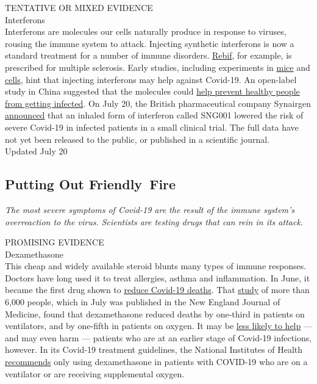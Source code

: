 TENTATIVE OR MIXED EVIDENCE\\
Interferons\\
Interferons are molecules our cells naturally produce in response to
viruses, rousing the immune system to attack. Injecting synthetic
interferons is now a standard treatment for a number of immune
disorders.
\href{https://www.nationalmssociety.org/Treating-MS/Medications/Rebif}{Rebif},
for example, is prescribed for multiple sclerosis. Early studies,
including experiments in
\href{https://pubmed.ncbi.nlm.nih.gov/32511406/}{mice} and
\href{https://academic.oup.com/jid/article/doi/10.1093/infdis/jiaa350/5860074}{cells},
hint that injecting interferons may help against Covid-19. An open-label
study in China suggested that the molecules could
\href{https://www.medrxiv.org/content/10.1101/2020.04.11.20061473v2}{help
prevent healthy people from getting infected}. On July 20, the British
pharmaceutical company Synairgen
\href{https://www.nytimes3xbfgragh.onion/2020/07/20/world/covid-19-treatment-synairgen-interferon-beta.html}{announced}
that an inhaled form of interferon called SNG001 lowered the risk of
severe Covid-19 in infected patients in a small clinical trial. The full
data have not yet been released to the public, or published in a
scientific journal.\\
Updated July 20

\hypertarget{putting-out-friendly-fire}{%
\subsection{Putting Out Friendly~Fire}\label{putting-out-friendly-fire}}

\emph{The most severe symptoms of Covid-19 are the result of the immune
system's overreaction to the virus. Scientists are testing drugs that
can rein in its attack.}

PROMISING EVIDENCE\\
Dexamethasone\\
This cheap and widely available steroid blunts many types of immune
responses. Doctors have long used it to treat allergies, asthma and
inflammation. In June, it became the first drug shown to
\href{https://www.nytimes3xbfgragh.onion/2020/06/16/world/europe/dexamethasone-coronavirus-covid.html?searchResultPosition=5}{reduce
Covid-19 deaths}. That
\href{https://www.nejm.org/doi/full/10.1056/NEJMoa2021436?query=featured_home}{study}
of more than 6,000 people, which in July was published in the New
England Journal of Medicine, found that dexamethasone reduced deaths by
one-third in patients on ventilators, and by one-fifth in patients on
oxygen. It may be
\href{https://www.nytimes3xbfgragh.onion/2020/06/24/health/coronavirus-dexamethasone.html?searchResultPosition=2}{less
likely to help} --- and may even harm --- patients who are at an earlier
stage of Covid-19 infections, however. In its Covid-19 treatment
guidelines, the National Institutes of Health
\href{https://www.covid19treatmentguidelines.nih.gov/dexamethasone/}{recommends}
only using dexamethasone in patients with COVID-19 who are on a
ventilator or are receiving supplemental oxygen.

